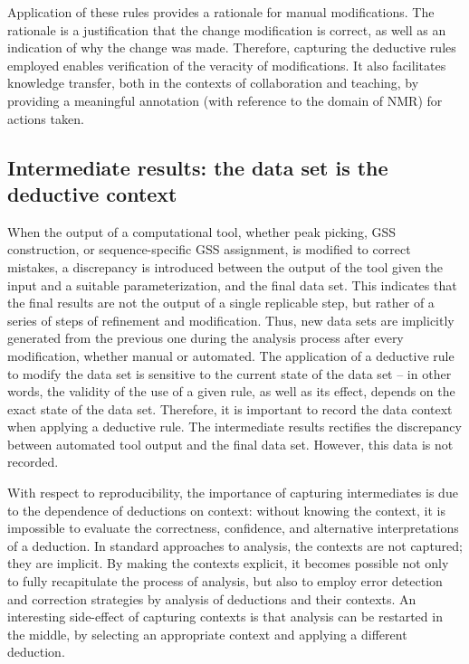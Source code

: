 Application of these rules provides a rationale for manual modifications.  The
rationale is a justification that the change modification is correct, as
well as an indication of why the change was made.  Therefore, capturing the
deductive rules employed enables verification of the veracity of modifications. 
It also facilitates knowledge transfer, both in the contexts of collaboration
and teaching, by providing a meaningful annotation (with reference to the
domain of NMR) for actions taken.


\subsection*{Intermediate results: the data set is the deductive context}
When the output of a computational tool, whether peak picking, GSS construction, 
or sequence-specific GSS assignment, is modified to correct mistakes,
a discrepancy is introduced between the output of the tool 
given the input and a suitable parameterization, and the final data set. 
This indicates that the final results are not the output of a single 
replicable step, but rather of a series of steps of refinement and 
modification.  Thus, new data sets are implicitly generated from the previous
one during the analysis process after every modification, whether manual or automated.
The application of a deductive rule to modify the data set is sensitive to
the current state of the data set -- in other words, the validity of the 
use of a given rule, as well as its effect, depends on the exact state of
the data set.  Therefore, it is important to record the data context when
applying a deductive rule.  The intermediate results rectifies the discrepancy 
between automated tool output and the final data set.  However, this data is 
not recorded.

With respect to reproducibility, the importance of capturing intermediates is 
due to the dependence of deductions on context: without knowing the context, 
it is impossible to evaluate the correctness, confidence, and alternative 
interpretations of a deduction.  In standard approaches to analysis, the 
contexts are not captured; they are implicit.  By making the contexts 
explicit, it becomes possible not only to fully recapitulate the process of 
analysis, but also to employ error detection and correction strategies by 
analysis of deductions and their contexts.  An interesting side-effect of 
capturing contexts is that analysis can be restarted in the middle, by 
selecting an appropriate context and applying a different deduction.


